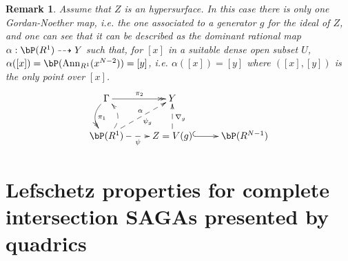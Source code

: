 \documentclass[a4paper,11pt]{amsart}
\newtheorem{remark}[theorem]{Remark}
\DeclareMathOperator{\Ann}{Ann}
\begin{document}
\begin{remark}
\label{REM:ALPHAandGN}
Assume that $Z$ is an hypersurface. In this case there is only one Gordan-Noether map, i.e. the one associated to a generator $g$ for the ideal of $Z$, and one can see that it can be described as the dominant rational map $\alpha:\bP(R^1)\dashrightarrow
Y$ such that, for $[x]$ in a suitable dense open subset $U$, $\alpha([x])= \bP(\Ann_{R^1}(x^{N-2}))=[y]$, i.e. $\alpha([x])=[y]$ where $([x],[y])$ is the only point over $[x]$.
$$
\xymatrix{
\Gamma \ar@{->>}[r]^{\pi_2}\ar@/_1.0pc/@{->>}[d]^{\pi_1} & Y \\
\bP(R^1) \ar@/_1.0pc/@{-->}[u]\ar@{-->}[r]_-{\psi} \ar@{-->}[ru]_-{\psi_g}^-{\alpha}
& Z=V(g) \ar@{-->}[u]_{\nabla_g} \ar@{^{(}->}[r] & \bP(R^{N-1})
}
$$
\end{remark}





\section{Lefschetz properties for complete intersection SAGAs presented by quadrics}
\label{SEC:4}
\end{document}
